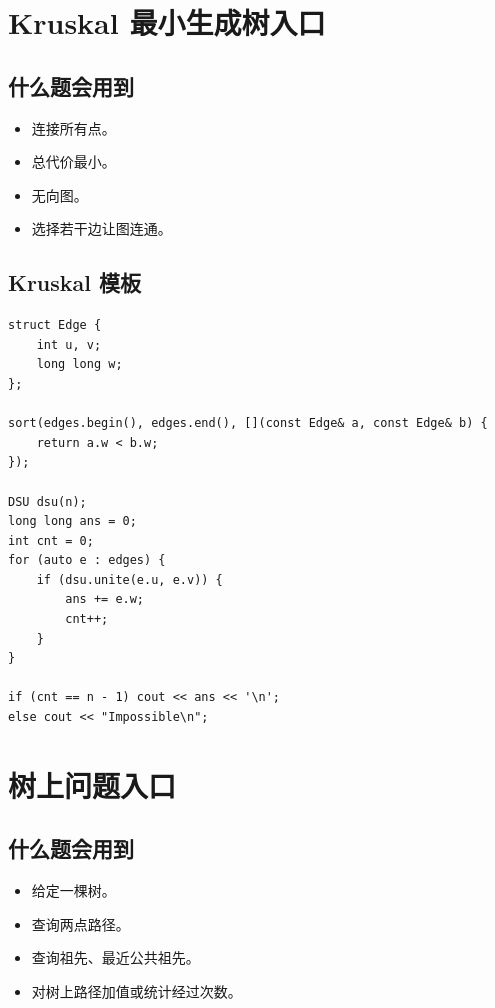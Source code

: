 \section{Kruskal 最小生成树入口}\label{sec:08-10}

\subsection{什么题会用到}

\begin{itemize}
  \item 连接所有点。
  \item 总代价最小。
  \item 无向图。
  \item 选择若干边让图连通。
\end{itemize}

\subsection{Kruskal 模板}

\begin{lstlisting}
struct Edge {
    int u, v;
    long long w;
};

sort(edges.begin(), edges.end(), [](const Edge& a, const Edge& b) {
    return a.w < b.w;
});

DSU dsu(n);
long long ans = 0;
int cnt = 0;
for (auto e : edges) {
    if (dsu.unite(e.u, e.v)) {
        ans += e.w;
        cnt++;
    }
}

if (cnt == n - 1) cout << ans << '\n';
else cout << "Impossible\n";
\end{lstlisting}

\section{树上问题入口}\label{sec:08-11}

\subsection{什么题会用到}

\begin{itemize}
  \item 给定一棵树。
  \item 查询两点路径。
  \item 查询祖先、最近公共祖先。
  \item 对树上路径加值或统计经过次数。
\end{itemize}

